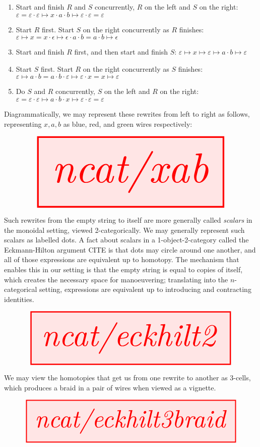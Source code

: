 \begin{enumerate}
\item{Start and finish $R$ and $S$ concurrently, $R$ on the left and $S$ on the right: $\varepsilon = \varepsilon \cdot \varepsilon \mapsto x \cdot a \cdot b \mapsto \varepsilon \cdot \varepsilon = \varepsilon$}
\item{Start $R$ first. Start $S$ on the right concurrently as $R$ finishes: $\varepsilon \mapsto x = x \cdot \epsilon \mapsto \epsilon \cdot a \cdot b = a \cdot b \mapsto \epsilon$}
\item{Start and finish $R$ first, and then start and finish $S$: $\varepsilon \mapsto x \mapsto \varepsilon \mapsto a \cdot b \mapsto \varepsilon$}
\item{Start $S$ first. Start $R$ on the right concurrently as $S$ finishes: $\varepsilon \mapsto a \cdot b = a \cdot b \cdot \varepsilon \mapsto \varepsilon \cdot x = x \mapsto \varepsilon $}
\item{Do $S$ and $R$ concurrently, $S$ on the left and $R$ on the right: $\varepsilon = \varepsilon \cdot \varepsilon \mapsto a \cdot b \cdot x \mapsto \varepsilon \cdot \varepsilon = \varepsilon $}
\end{enumerate}

Diagrammatically, we may represent these rewrites from left to right as follows, representing $x,a,b$ as blue, red, and green wires respectively:

\[\resizebox{\textwidth}{!}{\tikzfig{ncat/xab}}\]

Such rewrites from the empty string to itself are more generally called \emph{scalars} in the monoidal setting, viewed 2-categorically. We may generally represent such scalars as labelled dots. A fact about scalars in a 1-object-2-category called the Eckmann-Hilton argument \bR CITE \e is that dots may circle around one another, and all of those expressions are equivalent up to homotopy. The mechanism that enables this in our setting is that the empty string is equal to copies of itself, which creates the necessary space for manoeuvering; translating into the $n$-categorical setting, expressions are equivalent up to introducing and contracting identities.

\[\resizebox{\textwidth}{!}{\tikzfig{ncat/eckhilt2}}\]

We may view the homotopies that get us from one rewrite to another as 3-cells, which produces a braid in a pair of wires when viewed as a vignette.

\[\resizebox{\textwidth}{!}{\tikzfig{ncat/eckhilt3braid}}\]

